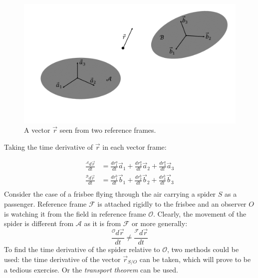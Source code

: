 \documentclass{UoNMCHA}
\numberwithin{equation}{section}
\begin{document}
\begin{figure}[ht]
    \begin{center}
        \includegraphics[width=.8\linewidth]{Figures/vectorDerivitive}
        \caption{A vector $\vec{r}$ seen from two reference frames.}
        \label{fig:vectorDerivitive}
    \end{center}
\end{figure}

Taking the time derivative of $\vec{r}$ in each vector frame:

\begin{equation}
	\begin{split}
		\frac{{}^\mathcal{A}d\vec{r}}{dt} &= \frac{dr^{a}_{1}}{dt}\vec{a}_{1} + \frac{dr^{a}_{2}}{dt}\vec{a}_{2} + \frac{dr^{a}_{3}}{dt}\vec{a}_{3}\\
		\frac{{}^\mathcal{B}d\vec{r}}{dt} &= \frac{dr^{b}_{1}}{dt}\vec{b}_{1} + \frac{dr^{b}_{2}}{dt}\vec{b}_{2} + \frac{dr^{b}_{3}}{dt}\vec{b}_{3}\\
	\end{split}
\end{equation}
Consider the case of a frisbee flying through the air carrying a spider $S$ as a passenger. Reference frame $\mathcal{F}$ is attached rigidly to the frisbee and an observer $O$ is watching it from the field in reference frame $\mathcal{O}$. Clearly, the movement of the spider is different from $\mathcal{A}$ as it is from $\mathcal{F}$ or more generally:
\begin{equation}
		\frac{{}^\mathcal{O}d\vec{r}}{dt} \neq \frac{{}^\mathcal{F}d\vec{r}}{dt}
\end{equation}
To find the time derivative of the spider relative to $\mathcal{O}$, two methods could be used: the time derivative of the vector $\vec{r}_{S/O}$ can be taken, which will prove to be a tedious exercise. Or the \textit{transport theorem} can be used.
\end{document}
